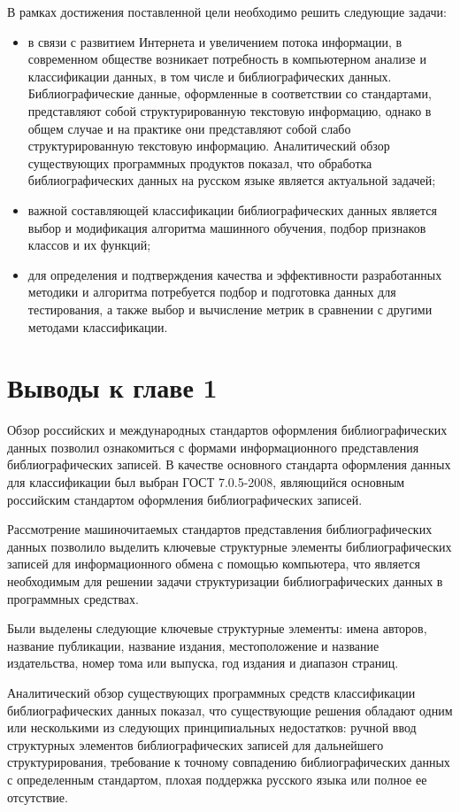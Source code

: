 В рамках достижения поставленной цели необходимо решить следующие задачи:
\begin{itemize}
\item в связи с развитием Интернета и увеличением потока информации, в современном обществе возникает потребность в компьютерном анализе и классификации данных, в том числе и библиографических данных. Библиографические данные, оформленные в соответствии со стандартами, представляют собой структурированную текстовую информацию, однако в общем случае и на практике они представляют собой слабо структурированную текстовую информацию. Аналитический обзор существующих программных продуктов показал, что обработка библиографических данных на русском языке является актуальной задачей;
\item важной составляющей классификации библиографических данных является выбор и модификация алгоритма машинного обучения, подбор признаков классов и их функций;
\item для определения и подтверждения качества и эффективности разработанных методики и алгоритма потребуется подбор и подготовка данных для тестирования, а также выбор и вычисление метрик в сравнении с другими методами классификации.
\end{itemize}

\section*{Выводы к главе 1}

Обзор российских и международных стандартов оформления библиографических данных позволил ознакомиться с формами информационного представления библиографических записей. В качестве основного стандарта оформления данных для классификации был выбран ГОСТ 7.0.5-2008, являющийся основным российским стандартом оформления библиографических записей.

Рассмотрение машиночитаемых стандартов представления библиографических данных позволило выделить ключевые структурные элементы библиографических записей для информационного обмена с помощью компьютера, что является необходимым для решении задачи структуризации библиографических данных в программных средствах.

Были выделены следующие ключевые структурные элементы: имена авторов, название публикации, название издания, местоположение и название издательства, номер тома или выпуска, год издания и диапазон страниц.

Аналитический обзор существующих программных средств классификации библиографических данных показал, что существующие решения обладают одним или несколькими из следующих принципиальных недостатков: ручной ввод структурных элементов библиографических записей для дальнейшего структурирования, требование к точному совпадению библиографических данных с определенным стандартом, плохая поддержка русского языка или полное ее отсутствие.

